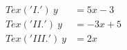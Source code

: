 \documentclass[preview]{standalone}
\begin{document}
\begin{align*}
Tex('I.')~y &= 5x-3\\ Tex('II.')~ y&= -3x+5 \\ Tex('III.')~ y &= 2x
\end{align*}
\end{document}
